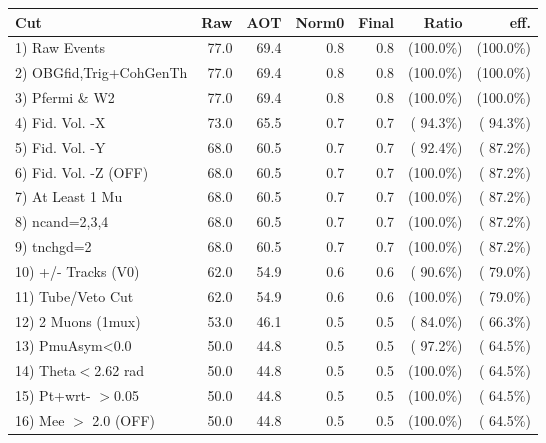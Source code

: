  \begin{table}[h!]\centering
 \begin{tabular}{||l||r|r|r|r|r|r||}
 \hline
 \hline
 Cut & Raw & AOT & Norm0 & Final & Ratio & eff.       \\
 \hline
  1) Raw Events           &         77.0 &         69.4 &          0.8 &          0.8 & (100.0\%) & (100.0\%) \\
  2) OBGfid,Trig+CohGenTh &         77.0 &         69.4 &          0.8 &          0.8 & (100.0\%) & (100.0\%) \\
  3) Pfermi \& W2         &         77.0 &         69.4 &          0.8 &          0.8 & (100.0\%) & (100.0\%) \\
  4) Fid. Vol. -X         &         73.0 &         65.5 &          0.7 &          0.7 & ( 94.3\%) & ( 94.3\%) \\
  5) Fid. Vol. -Y         &         68.0 &         60.5 &          0.7 &          0.7 & ( 92.4\%) & ( 87.2\%) \\
  6) Fid. Vol. -Z (OFF)   &         68.0 &         60.5 &          0.7 &          0.7 & (100.0\%) & ( 87.2\%) \\
  7) At Least 1 Mu        &         68.0 &         60.5 &          0.7 &          0.7 & (100.0\%) & ( 87.2\%) \\
  8) ncand=2,3,4          &         68.0 &         60.5 &          0.7 &          0.7 & (100.0\%) & ( 87.2\%) \\
  9) tnchgd=2             &         68.0 &         60.5 &          0.7 &          0.7 & (100.0\%) & ( 87.2\%) \\
 10) +/- Tracks (V0)      &         62.0 &         54.9 &          0.6 &          0.6 & ( 90.6\%) & ( 79.0\%) \\
 11) Tube/Veto Cut        &         62.0 &         54.9 &          0.6 &          0.6 & (100.0\%) & ( 79.0\%) \\
 12) 2 Muons (1mux)       &         53.0 &         46.1 &          0.5 &          0.5 & ( 84.0\%) & ( 66.3\%) \\
 13) PmuAsym<0.0          &         50.0 &         44.8 &          0.5 &          0.5 & ( 97.2\%) & ( 64.5\%) \\
 14) Theta$<$2.62 rad     &         50.0 &         44.8 &          0.5 &          0.5 & (100.0\%) & ( 64.5\%) \\
 15) Pt+wrt- $>$0.05      &         50.0 &         44.8 &          0.5 &          0.5 & (100.0\%) & ( 64.5\%) \\
 16) Mee $>$ 2.0  (OFF)   &         50.0 &         44.8 &          0.5 &          0.5 & (100.0\%) & ( 64.5\%) \\

\end{tabular}
\end{table}
